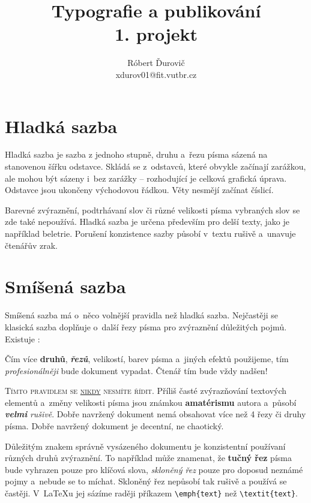\documentclass[11pt,twocolumn,a4paper]{article}
\title{Typografie a publikování \\ 1. projekt}
\author{Róbert Ďurovič \\ xdurov01@fit.vutbr.cz}
\date{}
\begin{document}
\maketitle

\section{Hladká sazba}

Hladká sazba je sazba z jednoho stupně, druhu a~řezu písma sázená na stanovenou šířku odstavce. Skládá se z~odstavců, které obvykle začínají zarážkou, ale mohou být sázeny i~bez zarážky -- rozhodující je celková grafická úprava. Odstavce jsou ukončeny východovou řádkou. Věty nesmějí začínat číslicí.

Barevné zvýraznění, podtrhávaní slov či různé velikosti písma vybraných slov se zde také nepoužívá. Hladká sazba je určena především pro delší texty, jako je například beletrie. Porušení konzistence sazby působí v~textu rušivě a~unavuje čtenářův zrak.

\section{Smíšená sazba}

Smíšená sazba má o~něco volnější pravidla než hladká sazba.  Nejčastěji se klasická sazba doplňuje o~další řezy písma pro zvýraznění důležitých pojmů. Existuje :

\begin{displayquote}
\quad Čím více \textbf{druhů}, \emph{\textbf{řezů}}, {\scriptsize velikostí}, barev písma a~jiných efektů použijeme, tím \emph{profesionálněji} bude dokument vypadat. Čtenář tím bude vždy {\huge nadšen!}
\end{displayquote}

\textsc{Tímto pravidlem se \underline{nikdy} nesmíte řídit.} Příliš časté zvýrazňování textových elementů a~změny velikosti {\tiny písma} jsou {\LARGE známkou} {\huge \textbf{amatérismu}} autora a~působí \textit{\textbf{velmi}} \emph{rušivě}. Dobře navržený dokument nemá obsahovat více než 4 řezy či druhy písma. {\ttfamily Dobře navržený dokument je decentní, ne chaotický}.

Důležitým znakem správně vysázeného dokumentu je konzistentní používaní různých druhů zvýraznění. To například může znamenat, že \textbf{tučný řez} písma bude vyhrazen pouze pro klíčová slova, \textit{skloněný řez} pouze pro doposud neznámé pojmy a~nebude se to míchat. Skloněný řez nepůsobí tak rušivě a používá se častěji. V~\LaTeX u jej sázíme raději příkazem \verb|\emph{text}|  než  \verb|\textit{text}|.
\end{document}
